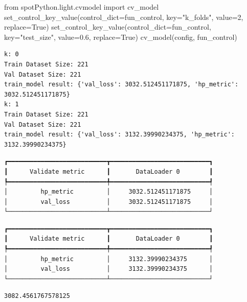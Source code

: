 \documentclass[
  letterpaper,
  DIV=11,
  numbers=noendperiod]{scrreprt}
\newenvironment{Shaded}{\begin{snugshade}}{\end{snugshade}}
\newcommand{\DecValTok}[1]{\textcolor[rgb]{0.68,0.00,0.00}{#1}}
\newcommand{\FloatTok}[1]{\textcolor[rgb]{0.68,0.00,0.00}{#1}}
\newcommand{\ImportTok}[1]{\textcolor[rgb]{0.00,0.46,0.62}{#1}}
\newcommand{\NormalTok}[1]{\textcolor[rgb]{0.00,0.23,0.31}{#1}}
\newcommand{\OperatorTok}[1]{\textcolor[rgb]{0.37,0.37,0.37}{#1}}
\newcommand{\StringTok}[1]{\textcolor[rgb]{0.13,0.47,0.30}{#1}}
\newcommand{\VariableTok}[1]{\textcolor[rgb]{0.07,0.07,0.07}{#1}}
\begin{document}
\begin{Shaded}
\begin{Highlighting}[]
\ImportTok{from}\NormalTok{ spotPython.light.cvmodel }\ImportTok{import}\NormalTok{ cv\_model}
\NormalTok{set\_control\_key\_value(control\_dict}\OperatorTok{=}\NormalTok{fun\_control,}
\NormalTok{                        key}\OperatorTok{=}\StringTok{"k\_folds"}\NormalTok{,}
\NormalTok{                        value}\OperatorTok{=}\DecValTok{2}\NormalTok{,}
\NormalTok{                        replace}\OperatorTok{=}\VariableTok{True}\NormalTok{)}
\NormalTok{set\_control\_key\_value(control\_dict}\OperatorTok{=}\NormalTok{fun\_control,}
\NormalTok{                        key}\OperatorTok{=}\StringTok{"test\_size"}\NormalTok{,}
\NormalTok{                        value}\OperatorTok{=}\FloatTok{0.6}\NormalTok{,}
\NormalTok{                        replace}\OperatorTok{=}\VariableTok{True}\NormalTok{)}
\NormalTok{cv\_model(config, fun\_control)}
\end{Highlighting}
\end{Shaded}

\begin{verbatim}
k: 0
Train Dataset Size: 221
Val Dataset Size: 221
train_model result: {'val_loss': 3032.512451171875, 'hp_metric': 3032.512451171875}
k: 1
Train Dataset Size: 221
Val Dataset Size: 221
train_model result: {'val_loss': 3132.39990234375, 'hp_metric': 3132.39990234375}
\end{verbatim}

\begin{verbatim}
┏━━━━━━━━━━━━━━━━━━━━━━━━━━━┳━━━━━━━━━━━━━━━━━━━━━━━━━━━┓
┃      Validate metric      ┃       DataLoader 0        ┃
┡━━━━━━━━━━━━━━━━━━━━━━━━━━━╇━━━━━━━━━━━━━━━━━━━━━━━━━━━┩
│         hp_metric         │     3032.512451171875     │
│         val_loss          │     3032.512451171875     │
└───────────────────────────┴───────────────────────────┘
\end{verbatim}

\begin{verbatim}
┏━━━━━━━━━━━━━━━━━━━━━━━━━━━┳━━━━━━━━━━━━━━━━━━━━━━━━━━━┓
┃      Validate metric      ┃       DataLoader 0        ┃
┡━━━━━━━━━━━━━━━━━━━━━━━━━━━╇━━━━━━━━━━━━━━━━━━━━━━━━━━━┩
│         hp_metric         │     3132.39990234375      │
│         val_loss          │     3132.39990234375      │
└───────────────────────────┴───────────────────────────┘
\end{verbatim}

\begin{verbatim}
3082.4561767578125
\end{verbatim}
\end{document}
